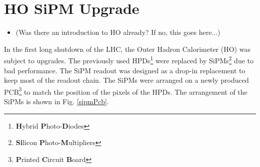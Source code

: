 \section{HO SiPM Upgrade}
\begin{itemize}
\item(Was there an introduction to HO already? If no, this goes here...)
\end{itemize}
In the first long shutdown of the LHC, the Outer Hadron Calorimeter (HO) was subject to upgrades. The previously used HPDs\footnote{{\bf H}ybrid {\bf P}hoto-{\bf D}iodes} were replaced by SiPMs\footnote{{\bf Si}licon {\bf P}hoto-{\bf M}ultipliers} due to bad performance. The SiPM readout was designed as a drop-in replacement to keep most of the readout chain. The SiPMs were arranged on a newly produced PCB\footnote{{\bf P}rinted {\bf C}ircuit {\bf B}oard} to match the position of the pixels of the HPDs. The arrangement of the SiPMs is shown in Fig. \ref{sipmPcb}.
